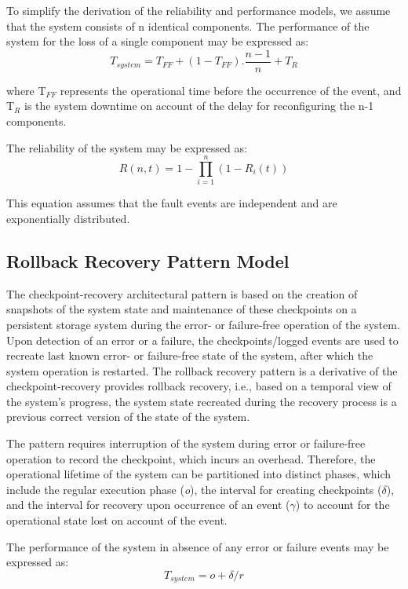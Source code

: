 To simplify the derivation of the reliability and performance models, we assume that the system consists of n identical components. The performance of the system for the loss of a single component may be expressed as:
\begin{equation}
T_{system} = T_{FF} + (1 - T_{FF}).\frac{n-1}{n} + T_{R}  
\label{eq:reconfig1}
\end{equation} 

where T$_{FF}$ represents the operational time before the occurrence of the event, and T$_{R}$ is the system downtime on account of the delay for reconfiguring the n-1 components. 

The reliability of the system may be expressed as: 
\begin{equation}
R(n,t)  = 1 - \prod_{i=1}^{n}(1-R_{i}(t))
\label{eq:reconfig2}
\end{equation}

This equation assumes that the fault events are independent and are exponentially distributed. 

\subsection{Rollback Recovery Pattern Model}
The checkpoint-recovery architectural pattern is based on the creation of snapshots of the system state and maintenance of these checkpoints on a persistent storage system during the error- or failure-free operation of the system. Upon detection of an error or a failure, the checkpoints/logged events are used to recreate last known error- or failure-free state of the system, after which the system operation is restarted. The rollback recovery pattern is a derivative of the checkpoint-recovery provides rollback recovery, i.e., based on a temporal view of the system's progress, the system state recreated during the recovery process is a previous correct version of the state of the system.  

The pattern requires interruption of the system during error or failure-free operation to record the checkpoint, which incurs an overhead. Therefore, the operational lifetime of the system can be partitioned into distinct phases, which include the regular execution phase (\textit{o}), the interval for creating checkpoints ($\delta$), and the interval for recovery upon occurrence of an event ($\gamma$) to account for the operational state lost on account of the event.

The performance of the system in absence of any error or failure events may be expressed as:
\begin{equation}
T_{system} = o + \delta/r
\label{eq:cr1}
\end{equation}


